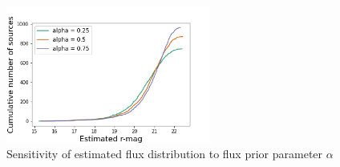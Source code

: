 \begin{figure}
    \centering
    \includegraphics[width = 0.6\textwidth]{figures/sensitivity_cdf_fluxes.png}
    \caption{Sensitivity of estimated flux distribution to flux prior parameter $\alpha$}
    \label{fig:cdf_sensitivity}
\end{figure}